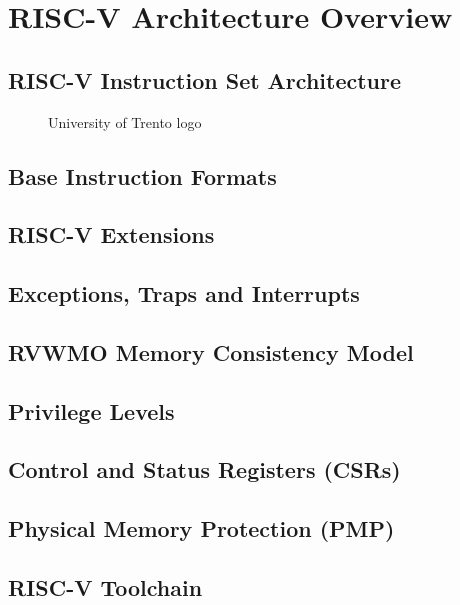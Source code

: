 \chapter{RISC-V Architecture Overview}
\label{cha:riscv}

\lipsum[1]

\section{RISC-V Instruction Set Architecture}
\label{cha:riscv_isa}

\lipsum[1]

\begin{figure}[htbp]
  \centering
  \def\stackalignment{r} %
  {\scriptsize }
  \caption{University of Trento logo}
  \label{fig:csr}
\end{figure}

\section{Base Instruction Formats}
\label{cha:riscv_bif}

\lipsum[1]

\section{RISC-V Extensions}
\label{cha:riscv_extensions}

\lipsum[1]

\section{Exceptions, Traps and Interrupts}
\label{cha:riscv_eti}

\lipsum[1]

\section{RVWMO Memory Consistency Model}
\label{cha:riscv_rvwmo}

\lipsum[1]

\section{Privilege Levels}
\label{cha:riscv_privileges}

\lipsum[1]

\section{Control and Status Registers (CSRs)}
\label{cha:riscv_csr}

\lipsum[1]

\section{Physical Memory Protection (PMP)}
\label{cha:riscv_pmp}

\lipsum[1]

\section{RISC-V Toolchain}
\label{cha:riscv_toolchain}

\lipsum[1]